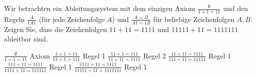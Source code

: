 
\begin{exercise}[52]

Wir betrachten ein Ableitungssystem mit dem einzigen Axiom
$\frac{\emptyset}{1 + 1 = 11}$ und den Regeln $\frac{A}{1A1}$ (für jede
Zeichenfolge $A$) und $\frac{A = B}{A1 = 1B}$ für beliebige Zeichenfolgen $A, B$. \\
Zeigen Sie, dass die Zeichenfolgen $11 + 11 = 1111$ und $11111 + 11 = 1111111$
ableitbar sind.

\end{exercise}


\begin{solution}

\phantom{}

\begin{algorithmic}[1]
  \State $\frac{\emptyset}{1 + 1 = 11}$
  \Comment Axiom
  \State $\frac{1 + 1 = 11}{11 + 1 = 111}$
  \Comment Regel 1
  \State $\frac{11 + 1 = 111}{11 + 11 = 1111}$
  \Comment Regel 2
  \State $\frac{11 + 11 = 1111}{111 + 11 = 11111}$
  \Comment Regel 1
  \State $\frac{111 + 11 = 1111}{1111 + 11 = 111111}$
  \Comment Regel 1
  \State $\frac{1111 + 11 = 1111}{11111 + 11 = 1111111}$
  \Comment Regel 1
\end{algorithmic}

\end{solution}

